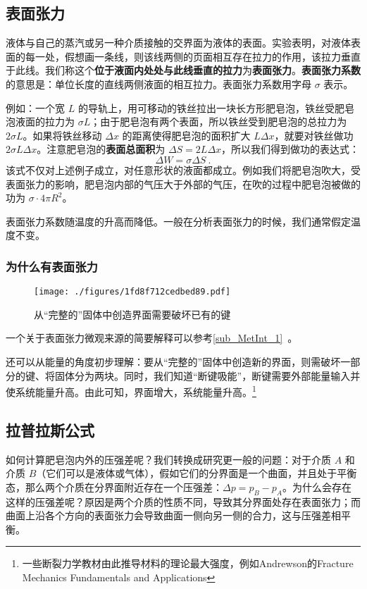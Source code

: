 

\subsection{表面张力}

液体与自己的蒸汽或另一种介质接触的交界面为液体的表面。实验表明，对液体表面的每一处，假想画一条线，则该线两侧的页面相互存在拉力的作用，该拉力垂直于此线。我们称这个\textbf{位于液面内处处与此线垂直的拉力}为\textbf{表面张力}。\textbf{表面张力系数} 的意思是：单位长度的直线两侧液面的相互拉力。表面张力系数用字母 $\sigma$ 表示。

例如：一个宽 $L$ 的导轨上，用可移动的铁丝拉出一块长方形肥皂泡，铁丝受肥皂泡液面的拉力为 $\sigma L$；由于肥皂泡有两个表面，所以铁丝受到肥皂泡的总拉力为 $2\sigma L$。如果将铁丝移动 $\Delta x$ 的距离使得肥皂泡的面积扩大 $L\Delta x$，就要对铁丝做功 $2\sigma L\Delta x$。注意肥皂泡的\textbf{表面总面积}为 $\Delta S=2 L \Delta x$，所以我们得到做功的表达式：
\begin{equation}
\Delta W=\sigma \Delta S~.
\end{equation}
该式不仅对上述例子成立，对任意形状的液面都成立。例如我们将肥皂泡吹大，受表面张力的影响，肥皂泡内部的气压大于外部的气压，在吹的过程中肥皂泡被做的功为 $\sigma\cdot 4\pi R^2$。

表面张力系数随温度的升高而降低。一般在分析表面张力的时候，我们通常假定温度不变。

\subsubsection{为什么有表面张力}
\begin{figure}[ht]
\centering
\texttt{[image: ./figures/1fd8f712cedbed89.pdf]}
\caption{从“完整的”固体中创造界面需要破坏已有的键} \label{fig_sftens_2}
\end{figure}
一个关于表面张力微观来源的简要解释可以参考\autoref{sub_MetInt_1}~。

还可以从能量的角度初步理解：要从“完整的”固体中创造新的界面，则需破坏一部分的键、将固体分为两块。同时，我们知道“断键吸能”，断键需要外部能量输入并使系统能量升高。由此可知，界面增大，系统能量升高。\footnote{一些断裂力学教材由此推导材料的理论最大强度，例如Andrewson的Fracture Mechanics Fundamentals and Applications}

\subsection{拉普拉斯公式}
如何计算肥皂泡内外的压强差呢？我们转换成研究更一般的问题：对于介质 $A$ 和介质 $B$（它们可以是液体或气体），假如它们的分界面是一个曲面，并且处于平衡态，那么两个介质在分界面附近存在一个压强差：$\Delta p=p_B-p_A$。为什么会存在这样的压强差呢？原因是两个介质的性质不同，导致其分界面处存在表面张力；而曲面上沿各个方向的表面张力会导致曲面一侧向另一侧的合力，这与压强差相平衡。

